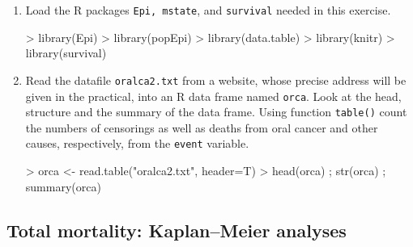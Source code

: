 \begin{enumerate}[resume]

\item Load the R packages \texttt{Epi, mstate}, and \texttt{survival} needed in this exercise.
\begin{Schunk}
\begin{Sinput}
> library(Epi)
> library(popEpi)
> library(data.table)
> library(knitr)
> library(survival)
\end{Sinput}
\end{Schunk}

\item Read the datafile {\tt oralca2.txt} from
a website, whose precise address  will be given in the practical,
 into an R data frame named \texttt{orca}.
Look at the head, structure and the summary of the data frame.
Using function \texttt{table()} count the numbers of censorings
as well as deaths from oral cancer and other causes, respectively,
 from the \texttt{event} variable.
\begin{Schunk}
\begin{Sinput}
> orca <- read.table("oralca2.txt", header=T)
> head(orca) ; str(orca) ; summary(orca)
\end{Sinput}
\end{Schunk}
\end{enumerate}

\subsection{Total mortality: Kaplan--Meier analyses}

